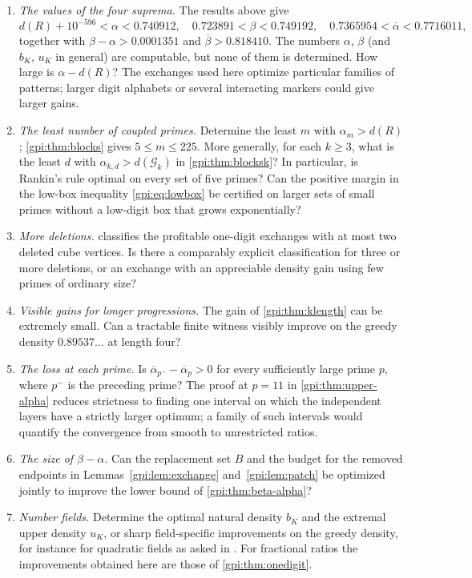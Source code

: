 \begin{enumerate}
\item \emph{The values of the four suprema.} The results above give
 \[
 d(R)+10^{-596}<\alpha<0.740912,\quad0.723891<\beta<0.749192,\quad
 0.7365954<\overline\alpha<0.7716011,
 \]
 together with $\beta-\alpha>0.0001351$ and $\overline\beta>0.818410$. The numbers $\alpha$,
 $\beta$ (and $b_K$, $u_K$ in general) are computable, but none of them is determined. How
 large is $\alpha-d(R)$? The exchanges used here optimize particular families of patterns;
 larger digit alphabets or several interacting markers could give larger gains.
\item \emph{The least number of coupled primes.} Determine the least $m$ with
 $\alpha_m>d(R)$; \cref{gpi:thm:blocks} gives $5\le m\le225$. More generally, for each $k\ge3$, what
 is the least $d$ with $\alpha_{k,d}>d(\mathcal G_k)$ in \cref{gpi:thm:blocksk}? In particular, is
 Rankin's rule optimal on every set of five primes? Can the positive margin in the low-box inequality
 \eqref{gpi:eq:lowbox} be certified on larger sets of small primes without a low-digit box
 that grows exponentially?
\item \emph{More deletions.}  classifies the profitable one-digit
 exchanges with at most two deleted cube vertices. Is there a comparably explicit
 classification for three or more deletions, or an exchange with an appreciable density gain
 using few primes of ordinary size?
\item \emph{Visible gains for longer progressions.} The gain of \cref{gpi:thm:klength} can be
 extremely small. Can a tractable finite witness visibly improve on the greedy density
 $0.89537\ldots$ at length four?
\item \emph{The loss at each prime.} Is $\overline\alpha_{p^-}-\overline\alpha_p>0$ for every
 sufficiently large prime $p$, where $p^-$ is the preceding prime? The proof at $p=11$ in
 \cref{gpi:thm:upper-alpha} reduces strictness to finding one interval on which the
 independent layers have a strictly larger optimum; a family of such intervals would
 quantify the convergence from smooth to unrestricted ratios.
\item \emph{The size of $\beta-\alpha$.} Can the replacement set $B$ and the budget for the
 removed endpoints in Lemmas~\ref{gpi:lem:exchange} and~\ref{gpi:lem:patch} be optimized jointly to improve
 the lower bound of \cref{gpi:thm:beta-alpha}?
\item \emph{Number fields.} Determine the optimal natural density $b_K$ and the extremal upper
 density $u_K$, or sharp field-specific improvements on the greedy density, for instance for
 quadratic fields as asked in \cite{Best2017Geometric}. For fractional ratios the
 improvements obtained here are those of \cref{gpi:thm:onedigit}.
\end{enumerate}
